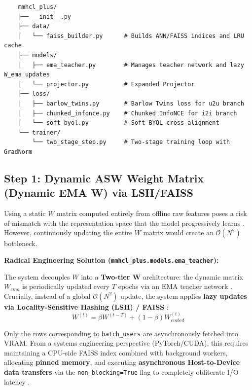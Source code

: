     \begin{tcolorbox}[scaffoldbox]
    \begin{verbatim}
    mmhcl_plus/
    ├── __init__.py
    ├── data/
    │   └── faiss_builder.py      # Builds ANN/FAISS indices and LRU cache
    ├── models/
    │   ├── ema_teacher.py        # Manages teacher network and lazy W_ema updates
    │   └── projector.py          # Expanded Projector
    ├── loss/
    │   ├── barlow_twins.py       # Barlow Twins loss for u2u branch
    │   ├── chunked_infonce.py    # Chunked InfoNCE for i2i branch
    │   └── soft_byol.py          # Soft BYOL cross-alignment
    └── trainer/
        └── two_stage_step.py     # Two-stage training loop with GradNorm
    \end{verbatim}
    \end{tcolorbox}
    
    \subsection{Step 1: Dynamic ASW Weight Matrix (Dynamic EMA W) via LSH/FAISS}
    
    Using a static $W$ matrix computed entirely from offline raw features poses a risk of mismatch with the representation space that the model progressively learns \cite{feng2025nlgcl}. However, continuously updating the entire $W$ matrix would create an $\mathcal{O}(N^2)$ bottleneck.
    
    \textbf{Radical Engineering Solution (\texttt{mmhcl\_plus.models.ema\_teacher}):}
    
    The system decouples $W$ into a \textbf{Two-tier W} architecture: the dynamic matrix $W_{ema}$ is periodically updated every $T$ epochs via an EMA teacher network \cite{grill2020byol}. Crucially, instead of a global $\mathcal{O}(N^2)$ update, the system applies \textbf{lazy updates via Locality-Sensitive Hashing (LSH) / FAISS} \cite{johnson2019faiss}:
    \begin{equation}
    W^{(t)} = \beta W^{(t-T)} + (1-\beta)W_{embed}^{(t)}
    \end{equation}
    
    Only the rows corresponding to \texttt{batch\_users} are asynchronously fetched into VRAM. From a systems engineering perspective (PyTorch/CUDA), this requires maintaining a CPU-side FAISS index combined with background workers, allocating \textbf{pinned memory}, and executing \textbf{asynchronous Host-to-Device data transfers} via the \texttt{non\_blocking=True} flag to completely obliterate I/O latency \cite{openreview2025hypergraphquantization}.
    
